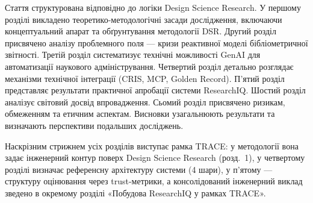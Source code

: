 Стаття структурована відповідно до логіки Design Science Research. У першому розділі викладено теоретико-методологічні засади дослідження, включаючи концептуальний апарат та обґрунтування методології DSR. Другий розділ присвячено аналізу проблемного поля --- кризи реактивної моделі бібліометричної звітності. Третій розділ систематизує технічні можливості GenAI для автоматизації наукового адміністрування. Четвертий розділ детально розглядає механізми технічної інтеграції (CRIS, MCP, Golden Record). П'ятий розділ представляє результати практичної апробації системи ResearchIQ. Шостий розділ аналізує світовий досвід впровадження. Сьомий розділ присвячено ризикам, обмеженням та етичним аспектам. Висновки узагальнюють результати та визначають перспективи подальших досліджень.

\iftrace
Наскрізним стрижнем усіх розділів виступає рамка TRACE: у методології вона задає інженерний контур поверх Design Science Research (розд.~1), у четвертому розділі визначає референсну архітектуру системи (4 шари), у п'ятому --- структуру оцінювання через trust-метрики, а консолідований інженерний виклад зведено в окремому розділі «Побудова ResearchIQ у рамках TRACE».
\fi